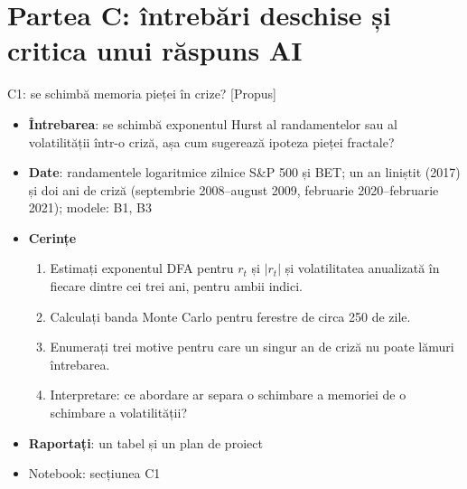 \section{Partea C: întrebări deschise și critica unui răspuns AI}

\begin{frame}{C1: se schimbă memoria pieței în crize? [Propus]}
\itemsize{\footnotesize}
\begin{itemize}
\item \textbf{Întrebarea}: se schimbă exponentul Hurst al randamentelor sau al volatilității într-o criză, așa cum sugerează ipoteza pieței fractale?
\item \textbf{Date}: randamentele logaritmice zilnice S\&P 500 și BET; un an liniștit (2017) și doi ani de criză (septembrie 2008--august 2009, februarie 2020--februarie 2021); modele: B1, B3
\item \textbf{Cerințe}
\begin{enumerate}
    \item Estimați exponentul DFA pentru $r_t$ și $|r_t|$ și volatilitatea anualizată în fiecare dintre cei trei ani, pentru ambii indici.
    \item Calculați banda Monte Carlo pentru ferestre de circa 250 de zile.
    \item Enumerați trei motive pentru care un singur an de criză nu poate lămuri întrebarea.
    \item Interpretare: ce abordare ar separa o schimbare a memoriei de o schimbare a volatilității?
\end{enumerate}
\item \textbf{Raportați}: un tabel și un plan de proiect
\item Notebook: secțiunea C1
\end{itemize}
\end{frame}


